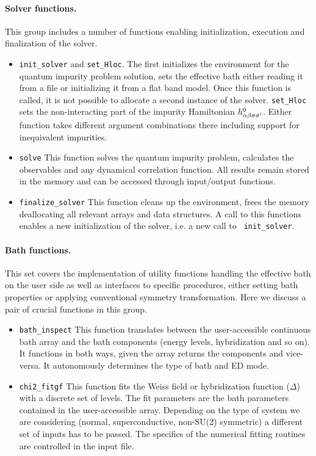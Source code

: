 \documentclass[edipack_sp.tex]{subfiles}
\begin{document}
\paragraph{{\bf Solver functions}.}
This group includes a number of functions enabling initialization,
execution and finalization  of the \NAME solver.
\begin{itemize}
  \item {\tt init\_solver} and {\tt set\_Hloc}. The first 
    initializes the \NAME environment for the quantum impurity problem
    solution, sets the effective bath either reading it from a file or
    initializing it from a flat band model. Once this function is
    called, it is not possible to allocate a second instance of the solver.
    {\tt set\_Hloc} sets the
    non-interacting part of the impurity Hamiltonian $h^0_{\alpha\beta\sigma\sigma'}$. 
    Either function takes different argument combinations there
    including support for inequivalent impurities.

  \item {\tt solve} This function solves the quantum impurity problem,
    calculates the observables and any dynamical correlation
    function. All results remain stored in the memory and can be accessed
    through input/output functions.

  \item {\tt finalize\_solver} This function cleans up the \NAME
    environment, frees the memory deallocating all relevant arrays and
    data structures. A call to this functions enables a new
    initialization of the solver, i.e. a new call to {\tt
      init\_solver}.  
  \end{itemize}


\paragraph{{\bf Bath functions}.}
This set covers the implementation of utility functions handling the
effective bath on the user side as well as interfaces to specific
\NAME procedures, either setting bath properties or applying
conventional symmetry transformation. Here we discuss 
a pair of crucial functions in this group.
\begin{itemize}
\item {\tt bath\_inspect} This function translates between the
  user-accessible continuous bath array and the bath components
  (energy levels, hybridization and so on). It functions in both ways,
  given the array returns the components and vice-versa. It
  autonomously determines the type of bath and ED mode.

\item {\tt chi2\_fitgf}
  This function fits the Weiss field or hybridization function ($\Delta$)
  with a discrete set of levels. The fit parameters are the bath
  parameters contained in the user-accessible array. Depending on the
  type of system we are considering (normal, superconductive,
  non-SU(2) symmetric) a different set of inputs has to be passed. The specifics
  of the numerical fitting routines are controlled in the input file.
  \end{itemize}
\end{document}
